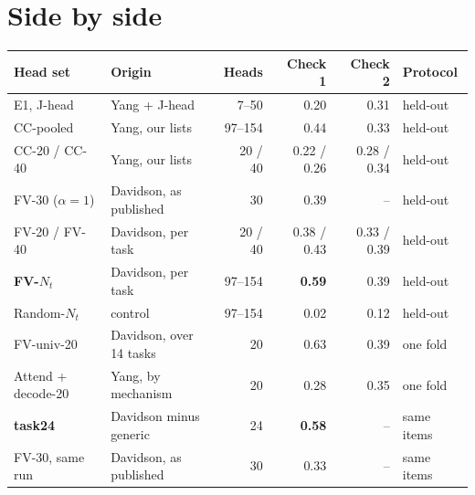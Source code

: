 \documentclass[10pt,a4paper]{article}
\begin{document}
\section{Side by side}

\begin{center}\small
\begin{tabularx}{\textwidth}{@{}lLrrrl@{}}
\toprule
Head set & Origin & Heads & Check 1 & Check 2 & Protocol \\
\midrule
E1, J-head & Yang + J-head & 7--50 & 0.20 & 0.31 & held-out \\
CC-pooled & Yang, our lists & 97--154 & 0.44 & 0.33 & held-out \\
CC-20 / CC-40 & Yang, our lists & 20 / 40 & 0.22 / 0.26 & 0.28 / 0.34 & held-out \\
FV-30 ($\alpha=1$) & Davidson, as published & 30 & 0.39 & -- & held-out \\
FV-20 / FV-40 & Davidson, per task & 20 / 40 & 0.38 / 0.43 & 0.33 / 0.39 & held-out \\
\textbf{FV-$N_t$} & Davidson, per task & 97--154 & \textbf{0.59} & 0.39 & held-out \\
Random-$N_t$ & control & 97--154 & 0.02 & 0.12 & held-out \\
FV-univ-20 & Davidson, over 14 tasks & 20 & 0.63 & 0.39 & one fold \\
Attend + decode-20 & Yang, by mechanism & 20 & 0.28 & 0.35 & one fold \\
\textbf{task24} & Davidson minus generic & 24 & \textbf{0.58} & -- & same items \\
FV-30, same run & Davidson, as published & 30 & 0.33 & -- & same items \\
\bottomrule
\end{tabularx}
\label{tab:compare}
\end{center}
\end{document}

